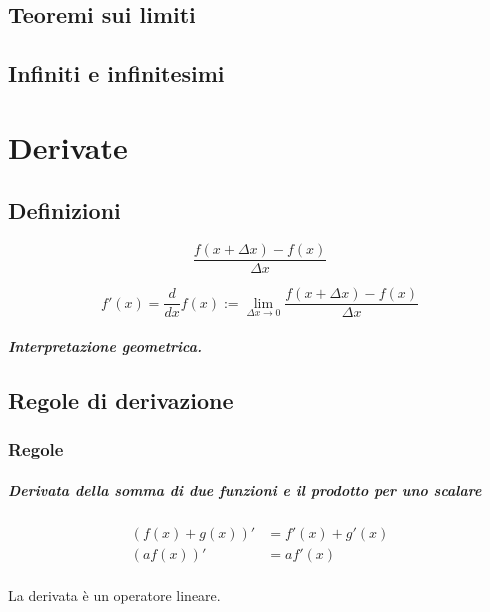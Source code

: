 \section{Teoremi sui limiti}

\section{Infiniti e infinitesimi}

\chapter{Derivate}

\section{Definizioni}
\begin{definition}
\begin{equation}
    \dfrac{f(x+\Delta x) - f(x)}{\Delta x}
\end{equation}
\end{definition}

\begin{definition}[Derivata]
\begin{equation}
  f'(x) = \dfrac{d }{dx} f(x) := \lim_{\Delta x \rightarrow 0} \dfrac{f(x+\Delta x) - f(x)}{\Delta x}
\end{equation}
\end{definition}

\begin{definition}
\end{definition}

\paragraph{Interpretazione geometrica.}

\section{Regole di derivazione}
\subsection{Regole}
\paragraph{Derivata della somma di due funzioni e il prodotto per uno scalare}
\begin{equation}
\begin{aligned}
    (f(x) + g(x))' & = f'(x) + g'(x) \\
    (a f(x))' & = a f'(x) \\
\end{aligned}
\end{equation}
\begin{property} La derivata è un operatore lineare.
\end{property}

